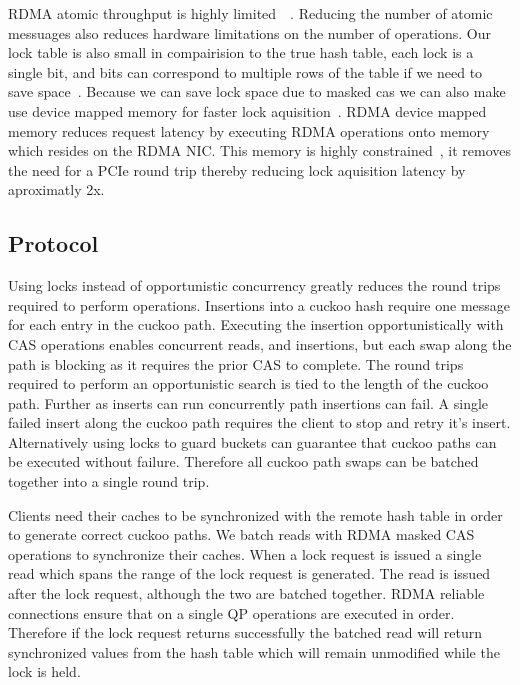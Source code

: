 RDMA atomic throughput is highly
limited~\cite{design-guidelines}~\todo{[swordbox]}. Reducing
the number of atomic messuages also reduces hardware
limitations on the number of operations. Our lock table is
also small in compairision to the true hash table, each lock
is a single bit, and bits can correspond to multiple rows of
the table if we need to save space~. Because we can save lock space due to
masked cas we can also make use device mapped memory for
faster lock aquisition~\cite{sherman}. RDMA device mapped
memory reduces request latency by executing RDMA operations
onto memory which resides on the RDMA NIC. This memory is
highly constrained~, it removes the need
for a PCIe round trip thereby reducing lock aquisition
latency by aproximatly 2x.


\subsection{Protocol}

Using locks instead of opportunistic concurrency greatly
reduces the round trips required to perform operations.
Insertions into a cuckoo hash require one message for each
entry in the cuckoo path. Executing the insertion
opportunistically with CAS operations enables concurrent
reads, and insertions, but each swap along the path is
blocking as it requires the prior CAS to complete. The round
trips required to perform an opportunistic search is tied to
the length of the cuckoo path. Further as inserts can run
concurrently path insertions can fail. A single failed
insert along the cuckoo path requires the client to stop and
retry it's insert. Alternatively using locks to guard
buckets can guarantee that cuckoo paths can be executed
without failure. Therefore all cuckoo path swaps can be
batched together into a single round trip.

Clients need their caches to be synchronized with the remote
hash table in order to generate correct cuckoo paths. We
batch reads with RDMA masked CAS operations to synchronize
their caches. When a lock request is issued a single read
which spans the range of the lock request is generated. The
read is issued after the lock request, although the two are
batched together. RDMA reliable connections ensure that on a
single QP operations are executed in order. Therefore if the
lock request returns successfully the batched read will
return synchronized values from the hash table which will
remain unmodified while the lock is held.

